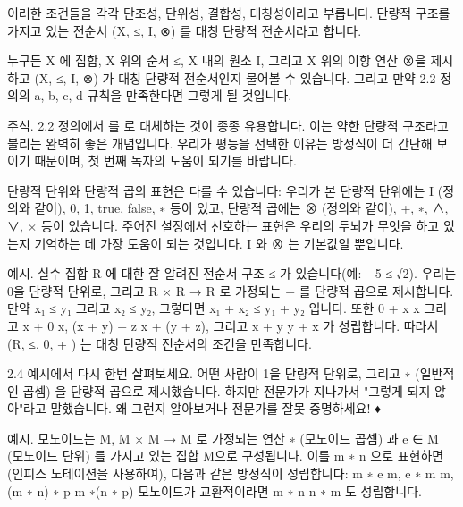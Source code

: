 \documentclass[11pt, a4paper, twoside, openany]{book}
\begin{document}
\par\medskip
이러한 조건들을 각각 단조성, 단위성, 결합성, 대칭성이라고 부릅니다.  단량적 구조를 가지고 있는 전순서 (X, ≤, I, ⊗) 를 대칭 단량적 전순서라고 합니다.

\par\medskip
누구든 X 에 집합, X 위의 순서 ≤, X 내의 원소 I, 그리고 X 위의 이항 연산 ⊗을 제시하고 (X, ≤, I, ⊗) 가 대칭 단량적 전순서인지 물어볼 수 있습니다. 그리고 만약 2.2 정의의 a, b, c, d 규칙을 만족한다면 그렇게 될 것입니다.

\par{} 주석. 2.2 정의에서 를 로 대체하는 것이 종종 유용합니다. 이는 약한 단량적 구조라고 불리는 완벽히 좋은 개념입니다. 우리가 평등을 선택한 이유는 방정식이 더 간단해 보이기 때문이며, 첫 번째 독자의 도움이 되기를 바랍니다.

\par\medskip
단량적 단위와 단량적 곱의 표현은 다를 수 있습니다: 우리가 본 단량적 단위에는 I (정의와 같이), 0, 1, true, false, {∗} 등이 있고, 단량적 곱에는 ⊗ (정의와 같이), +, ∗, ∧, ∨, × 등이 있습니다. 주어진 설정에서 선호하는 표현은 우리의 두뇌가 무엇을 하고 있는지 기억하는 데 가장 도움이 되는 것입니다. I 와 ⊗ 는 기본값일 뿐입니다.

\par{} 예시. 실수 집합 R 에 대한 잘 알려진 전순서 구조 ≤ 가 있습니다(예: −5 ≤ √2). 우리는 0\hspace{0pt}을 단량적 단위로, 그리고 R × R → R 로 가정되는 + 를 단량적 곱으로 제시합니다. 만약 x₁ ≤ y₁ 그리고 x₂ ≤ y₂, 그렇다면 x₁ + x₂ ≤ y₁ + y₂ 입니다. 또한 0 + x  x 그리고 x + 0  x, (x + y) + z  x + (y + z), 그리고 x + y  y + x 가 성립합니다. 따라서 (R, ≤, 0, + ) 는 대칭 단량적 전순서의 조건을 만족합니다.

\par{} 
\begin{exercisebox}[연습문제.]
2.4 예시에서 다시 한번 살펴보세요. 어떤 사람이 1\hspace{0pt}을 단량적 단위로, 그리고 ∗ (일반적인 곱셈) 을 단량적 곱으로 제시했습니다. 하지만 전문가가 지나가서 "그렇게 되지 않아"라고 말했습니다. 왜 그런지 알아보거나 전문가를 잘못 증명하세요!
♦
\end{exercisebox}

\par{} 예시. 모노이드는 M, M × M → M 로 가정되는 연산 ∗ (모노이드 곱셈) 과 e ∈ M (모노이드 단위) 를 가지고 있는 집합 M\hspace{0pt}으로 구성됩니다. 이를  m ∗ n 으로 표현하면(인피스 노테이션을 사용하여), 다음과 같은 방정식이 성립합니다:
 m ∗ e  m,
e ∗ m  m,
(m ∗ n) ∗ p  m ∗(n ∗ p)
모노이드가 교환적이라면 m ∗ n  n ∗ m 도 성립합니다.
\end{document}
